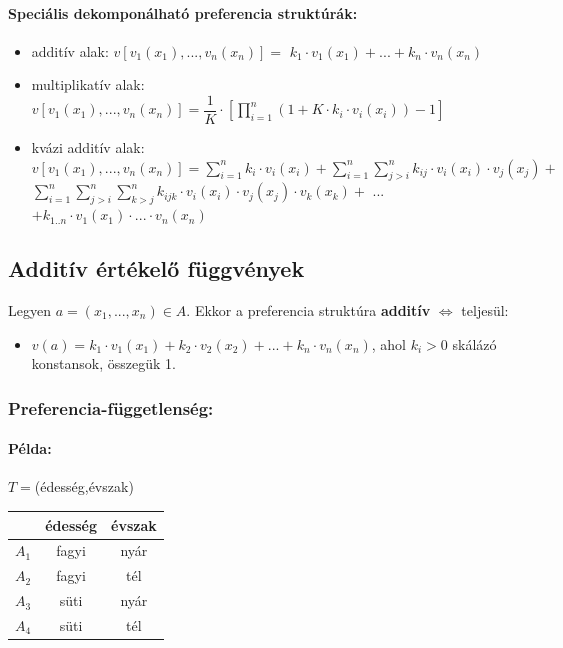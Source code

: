 \documentclass[a4paper,12pt]{article}
\begin{document}
\paragraph{Speciális dekomponálható preferencia struktúrák:}
\begin{itemize}
\item additív alak: $v[v_1(x_1), ..., v_n(x_n)] = $ $k_1 \cdot v_1(x_1) + ... + k_n \cdot v_n(x_n)$
\item multiplikatív alak: $v[v_1(x_1), ..., v_n(x_n)] = \dfrac{1}{K} \cdot [ \prod_{i=1}^n ( 1 + K \cdot k_i \cdot v_i(x_i)) - 1 ]$
\item kvázi additív alak: $v[v_1(x_1), ..., v_n(x_n)] = \sum_{i=1}^n k_i \cdot v_i(x_i)+
\sum_{i=1}^n \sum_{j>i}^n k_{ij} \cdot v_i(x_i) \cdot v_j(x_j) +$
$\sum_{i=1}^n \sum_{j>i}^n \sum_{k>j}^n k_{ijk} \cdot v_i(x_i) \cdot v_j(x_j) \cdot v_k(x_k) +$ ... 
$+k_{1..n} \cdot v_1(x_1) \cdot ... \cdot v_n(x_n) $
\end{itemize}

\subsection{Additív értékelő függvények}

Legyen $a=(x_1, ... , x_n) \in A$. Ekkor a preferencia struktúra \textbf{additív} $\Leftrightarrow$ teljesül:
\begin{itemize}
\item $v(a) = k_1 \cdot v_1(x_1) + k_2 \cdot v_2(x_2) + ... + k_n \cdot v_n(x_n)$, ahol $k_i > 0$ skálázó konstansok, összegük 1.
\end{itemize}

\subsubsection{Preferencia-függetlenség: }

\paragraph{Példa:}  $T=$(édesség,évszak)

\begin{center}
\begin{tabular}{c||c|c}
 & édesség& évszak \\
 \hline
 $A_1$& fagyi & nyár \\
 $A_2$& fagyi & tél \\
 $A_3$& süti & nyár \\
 $A_4$& süti & tél \\
\end{tabular}
\end{center}
\end{document}
